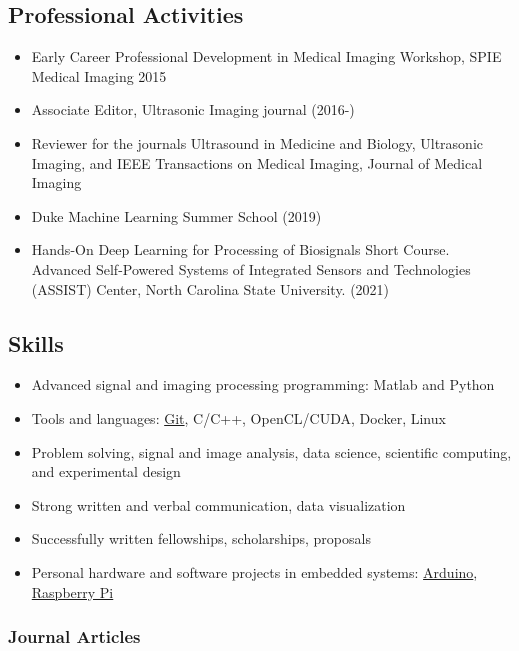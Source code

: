 \documentclass[
]{article}
\providecommand{\tightlist}{%
  \setlength{\itemsep}{0pt}\setlength{\parskip}{0pt}}
\begin{document}
\hypertarget{professional-activities}{%
\subsection{Professional Activities}\label{professional-activities}}

\begin{itemize}
\tightlist
\item
  Early Career Professional Development in Medical Imaging Workshop,
  SPIE Medical Imaging 2015
\item
  Associate Editor, Ultrasonic Imaging journal (2016-)
\item
  Reviewer for the journals Ultrasound in Medicine and Biology,
  Ultrasonic Imaging, and IEEE Transactions on Medical Imaging, Journal
  of Medical Imaging
\item
  Duke Machine Learning Summer School (2019)
\item
  Hands-On Deep Learning for Processing of Biosignals Short Course.
  Advanced Self-Powered Systems of Integrated Sensors and Technologies
  (ASSIST) Center, North Carolina State University. (2021)
\end{itemize}

\hypertarget{skills}{%
\subsection{Skills}\label{skills}}

\begin{itemize}
\tightlist
\item
  Advanced signal and imaging processing programming: Matlab and Python
\item
  Tools and languages: \href{http://git-scm.com/}{Git}, C/C++,
  OpenCL/CUDA, Docker, Linux
\item
  Problem solving, signal and image analysis, data science, scientific
  computing, and experimental design
\item
  Strong written and verbal communication, data visualization
\item
  Successfully written fellowships, scholarships, proposals
\item
  Personal hardware and software projects in embedded systems:
  \href{http://www.arduino.cc/}{Arduino},
  \href{http://www.raspberrypi.org/}{Raspberry Pi}
\end{itemize}

\hypertarget{journal-articles}{%
\subsubsection{Journal Articles}\label{journal-articles}}
\end{document}
